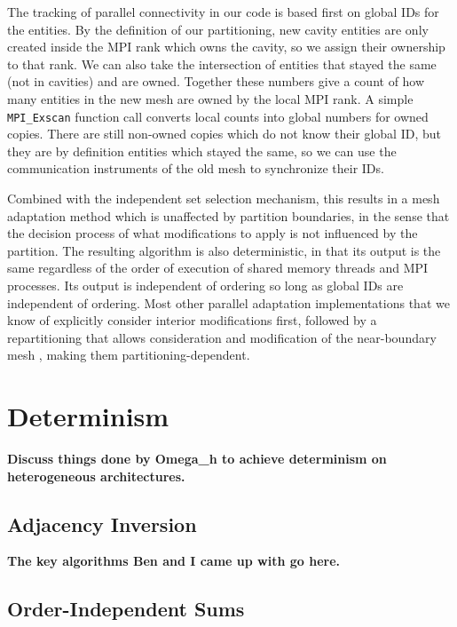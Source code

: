 The tracking of parallel connectivity in our code is based first on global
IDs for the entities.
By the definition of our partitioning, new cavity entities are only created
inside the MPI rank which owns the cavity, so we assign their ownership
to that rank.
We can also take the intersection of entities that stayed the same
(not in cavities) and are owned.
Together these numbers give a count of how many entities in the new mesh are owned
by the local MPI rank.
A simple \texttt{MPI\_Exscan} function call converts local counts into
global numbers for owned copies.
There are still non-owned copies which do not know their global ID, but they
are by definition entities which stayed the same, so we can use the
communication instruments of the old mesh to synchronize their IDs.

Combined with the independent set selection mechanism, this results
in a mesh adaptation method which is unaffected by partition boundaries,
in the sense that the decision process of what modifications to apply
is not influenced by the partition.
The resulting algorithm is also deterministic,
in that its output is the same regardless of the order of
execution of shared memory threads and MPI processes.
Its output is independent
of ordering so long as global IDs are independent of ordering.
Most other parallel adaptation implementations that we know of explicitly
consider interior modifications first, followed by a repartitioning that
allows consideration and modification of the near-boundary mesh
\cite{loseille2015parallel,de1999parallel}, making them
partitioning-dependent.

\section{Determinism}
\label{sec:determinism}

{\bf Discuss things done by Omega\_h to achieve
determinism on heterogeneous architectures.}

\subsection{Adjacency Inversion}

{\bf The key algorithms Ben and I came up with go here.}

\subsection{Order-Independent Sums}
\label{sec:repro_sum}


